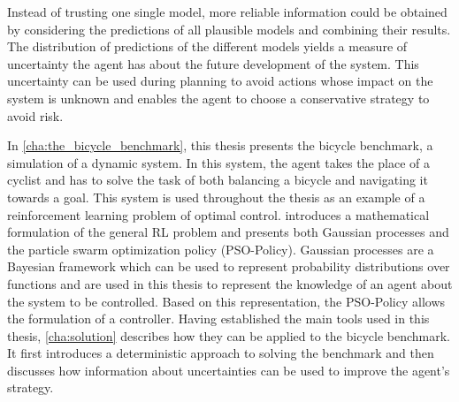 Instead of trusting one single model, more reliable information could be obtained by considering the predictions of all plausible models and combining their results.
The distribution of predictions of the different models yields a measure of uncertainty the agent has about the future development of the system.
This uncertainty can be used during planning to avoid actions whose impact on the system is unknown and enables the agent to choose a conservative strategy to avoid risk.

In \cref{cha:the_bicycle_benchmark}, this thesis presents the bicycle benchmark, a simulation of a dynamic system.
In this system, the agent takes the place of a cyclist and has to solve the task of both balancing a bicycle and navigating it towards a goal.
This system is used throughout the thesis as an example of a reinforcement learning problem of optimal control.
 introduces a mathematical formulation of the general RL problem and presents both Gaussian processes and the particle swarm optimization policy (PSO-Policy).
Gaussian processes are a Bayesian framework which can be used to represent probability distributions over functions and are used in this thesis to represent the knowledge of an agent about the system to be controlled.
Based on this representation, the PSO-Policy allows the formulation of a controller.
Having established the main tools used in this thesis, \cref{cha:solution} describes how they can be applied to the bicycle benchmark.
It first introduces a deterministic approach to solving the benchmark and then discusses how information about uncertainties can be used to improve the agent's strategy.
